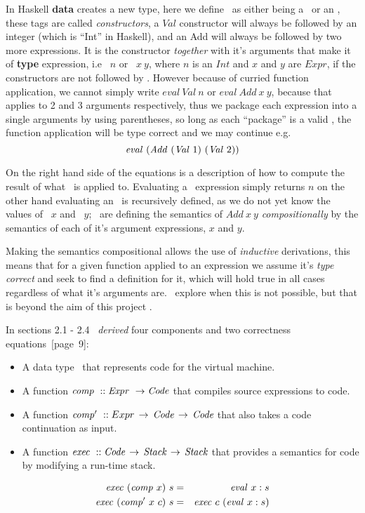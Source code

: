 \documentclass {article}
\begin{document}
In Haskell \textbf{data} creates a new type,
here we define \expr\ as either being a \val\
or an \add, these tags are called \emph{constructors},
a $Val$ constructor will always be followed by an integer
(which is ``Int'' in Haskell),
and an Add will always be followed by two more expressions.
It is the constructor \emph{together} with 
it's arguments that make it of \textbf{type}
expression, i.e \val\ $n$ or \add\ $x\ y$,
where $n$ is an $Int$ and $x$ and $y$ are $Expr$,
if the constructors are not followed by .
However because of curried function application,
we cannot simply write 
$eval\ Val\ n$ or $eval\ Add\ x\ y$,
because that applies \eval to 2 and 3 arguments respectively,
thus we package each expression into a single arguments
by using parentheses, so long as each ``package'' is a
valid \expr, the function application will be type correct
and we may continue e.g.
\[ \mathit{eval\ } (\mathit{Add\ } (\mathit{Val\ } 1)\ (\mathit{Val\ } 2)) \]

On the right hand side of the equations is a
description of how to compute 
the result of what \eval\ is applied to.
Evaluating a \val\ expression simply returns $n$
on the other hand evaluating an \add\
is recursively defined, as we do not yet know
the values of \eval\ $x$ and  \eval\ $y$; \BH\ are defining the
semantics of $Add\ x\ y$ \emph{compositionally} by the 
semantics of each of it's argument expressions, $x$ and $y$.

Making the semantics compositional allows
the use of \textit{inductive} derivations,
this means that for a given 
function applied to an expression
we assume it's \textit{type correct} and seek to find
a definition for it, which will hold true in
all cases regardless of what it's arguments are.
\BH\ explore
when this is not possible, but that is beyond
the aim of this project \cite{bandh}.

In sections 2.1 - 2.4 \BH\
\emph{derived} four 
components and two correctness equations\cite{bandh}~[page~9]:
\newcommand{\exec}{\textit{exec}}
\newcommand{\comp }{\textit{comp}}
\newcommand{\compp}{\textit{comp'}}
\newcommand{\Exec}{\mathit{exec\ }}
\newcommand{\Comp}{\mathit{comp\ }}
\newcommand{\Compp}{\mathit{comp'\  }}
\begin{itemize}
\item A data type \code\ that represents
	code for the virtual machine.
\item A function \( \Comp :: \Expr \rightarrow \code \)
	that compiles source expressions to code.
\item A function 
	\( \Compp::Expr \, \rightarrow \, \code \, \rightarrow \, \code \)
	that also takes a code continuation as input.
\item A function
	\( \Exec :: \code \, \rightarrow \, \textit{Stack} \, \rightarrow \, \textit{Stack} \)
	that provides a semantics for code by modifying a run-time stack.
\end{itemize}
\begin{eqnarray}
\Exec  (\Comp   x)\  s &=& \evalf x:s \label{spec1}\\
\Exec  (\Compp  x\  c)\ s &=& \Exec  c\  (\evalf x:s) \label{spec2}
\end{eqnarray}
\end{document}
